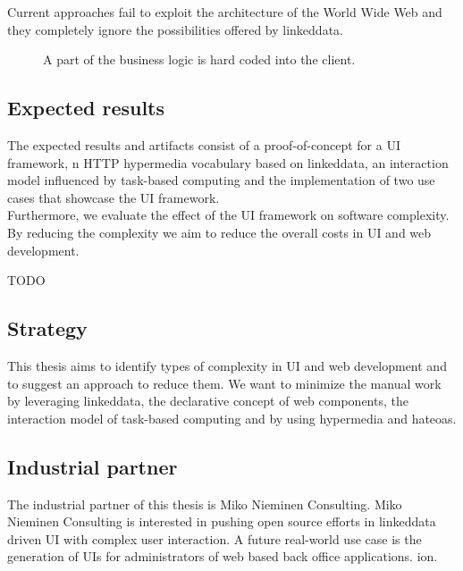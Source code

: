 Current approaches fail to exploit the architecture of the World Wide Web and they completely ignore the possibilities offered by \gls{linkeddata}.

\begin{figure}[!htb]
  \caption{A part of the business logic is hard coded into the client.}
  \label{fig:hardcoded}
\end{figure}

\subsection{Expected results}
The expected results and artifacts consist of a proof-of-concept for a UI framework, n HTTP \gls{hypermedia} vocabulary based on \gls{linkeddata}, an interaction model influenced by task-based computing and the implementation of two use cases that showcase the UI framework. \\
Furthermore, we evaluate the effect of the UI framework on software complexity. By reducing the complexity we aim to reduce the overall costs in UI and web development.

TODO

\subsection{Strategy}\label{strategy}
This thesis aims to identify types of complexity in UI and web development and to suggest an approach to reduce them.
We want to minimize the manual work by leveraging \gls{linkeddata}, the declarative concept of web components, the interaction model of task-based computing and by using \gls{hypermedia} and \gls{hateoas}.

\subsection{Industrial partner}
The industrial partner of this thesis is Miko Nieminen Consulting. Miko Nieminen Consulting is interested in pushing open source efforts in \gls{linkeddata} driven UI with complex user interaction. A future real-world use case is the generation of UIs for administrators of web based back office applications.
ion.
